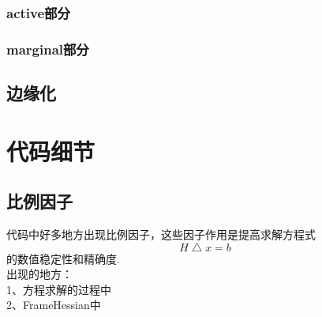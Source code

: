 \subsection*{active部分}

\subsection*{marginal部分}

\section{边缘化}


\chapter{代码细节}
\section{比例因子}
代码中好多地方出现比例因子，这些因子作用是提高求解方程式 $$ H\bigtriangleup\!x=b $$的数值稳定性和精确度.\\
出现的地方：\\
1、方程求解的过程中\\
2、FrameHessian中\\
